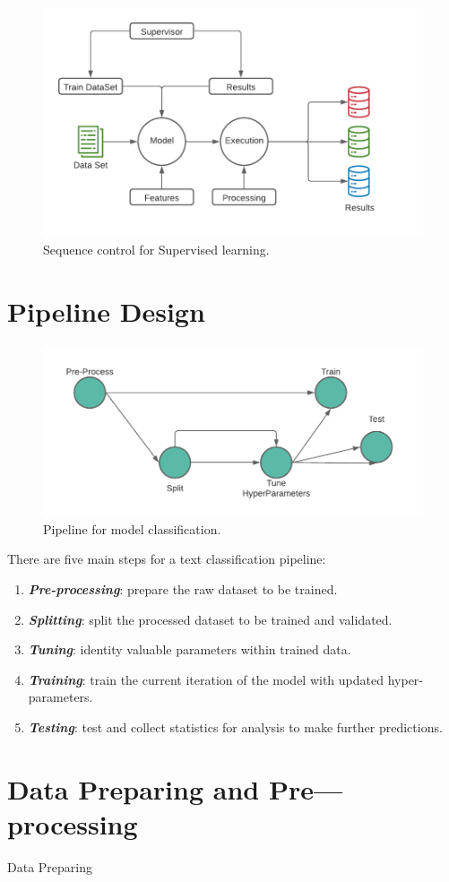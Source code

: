 \begin{figure}[H]
    \centering
    \includegraphics[width=\textwidth]{figures/chapter-5/SupervisedLearningChart.pdf}
    \caption[SupervisedLearning]{Sequence control for Supervised learning.
    \label{fig:SupervisedLearningChart}}
\end{figure}

\section{Pipeline Design}

\begin{figure}[H]
    \centering
    \includegraphics[width=\textwidth]{figures/chapter-5/Pipeline.pdf}
    \caption[MLTCPipeline]{Pipeline for model classification.
    \label{fig:MLTCPipeline}}
\end{figure}

There are five main steps for a text classification pipeline:

\begin{enumerate}
    \item \textbf{\textit{Pre-processing}}: prepare the raw dataset to be trained.
    \item \textbf{\textit{Splitting}}: split the processed dataset to be trained and validated.
    \item \textbf{\textit{Tuning}}: identity valuable parameters within trained data.
    \item \textbf{\textit{Training}}: train the current iteration of the model with updated hyper-parameters.
    \item \textbf{\textit{Testing}}: test and collect statistics for analysis to make further predictions.
\end{enumerate}

\section{Data Preparing and Pre---processing}

Data Preparing
